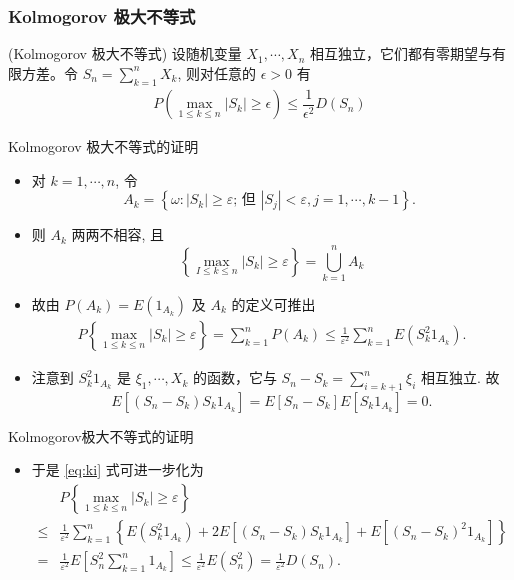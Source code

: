 \begin{frame}
	\frametitle{{\rm Kolmogorov} 极大不等式}
	\begin{thm}
		({\rm Kolmogorov} 极大不等式) 设随机变量 $X_1,\cdots, X_n$ 相互独立，它们都有零期望与有限方差。令 $S_n=\sum_{k=1}^nX_k$, 则对任意的 $\epsilon>0$ 有
		\begin{eqnarray}\label{eq:klie}
			P(\max_{1\leq k\leq n}|S_k|\geq \epsilon)\leq \dfrac{1}{\epsilon^2}D(S_n)
		\end{eqnarray}

	\end{thm}



\end{frame}
\begin{frame}{{\rm Kolmogorov} 极大不等式的证明}
\begin{itemize}[<+-|alert@+>]
	\item 对 $k=1, \cdots, n$, 令
	\[
	A_{k}=\left\{\omega:\left|S_{k}\right| \geq \varepsilon \text {; 但 }\left|S_{j}\right|<\varepsilon, j=1, \cdots, k-1\right\} \text {. }
	\]
\item 则 $A_{k}$ 两两不相容, 且
	\[
	\left\{\max _{I \leq k \leq n}\left|S_{k}\right| \geq \varepsilon\right\}=\bigcup_{k=1}^{n} A_{k}
	\]
\item 故由 $P\left(A_{k}\right)=E\left(1_{A_k}\right)$ 及 $A_{k}$ 的定义可推出
	\begin{align}\label{eq:ki}
		P\left\{\max _{1 \leq k \leq n}\left|S_{k}\right| \geq \varepsilon\right\}=\sum_{k=1}^{n} P\left(A_{k}\right) \leq \frac{1}{\varepsilon^{2}} \sum_{k=1}^{n} E\left(S_{k}^{2} 1_{A_k}\right).
	\end{align}

	\item 注意到 $S_{k}^{2} 1_{A_k}$ 是 $\xi_{1}, \cdots, X_{k}$ 的函数，它与 $S_{n}-S_{k}=\sum_{i=k+1}^{n} \xi_{i}$ 相互独立. 故
	\[
	E\left[\left(S_{n}-S_{k}\right) S_{k} 1_{A_k}\right]=E\left[S_n-S_{k}\right] E\left[S_{k} 1_{A_k}\right]=0 .
	\]
\end{itemize}

\end{frame}

\begin{frame}{Kolmogorov极大不等式的证明}
\begin{itemize}[<+-|alert@+>]
	\item 于是 \eqref{eq:ki} 式可进一步化为
	\[\begin{aligned}
		& P\left\{\max _{1 \leq k \leq n}\left|S_{k}\right| \geq \varepsilon\right\} \\
		\leq & \frac{1}{\varepsilon^{2}} \sum_{k=1}^{n}\left\{E\left(S_{k}^{2} 1_{A_k}\right)+2 E\left[\left(S_{n}-S_{k}\right) S_{k} 1_{A_k}\right]+E\left[\left(S_{n}-S_{k}\right)^{2} 1_{A_k}\right]\right\} \\
		= & \frac{1}{\varepsilon^{2}} E\left[S_{n}^{2} \sum_{k=1}^{n} 1_{A_k}\right] \leq \frac{1}{\varepsilon^{2}} E\left(S_{n}^{2}\right)=\frac{1}{\varepsilon^{2}} D\left(S_{n}\right) .
	\end{aligned}
	\]
\end{itemize}


\end{frame}

